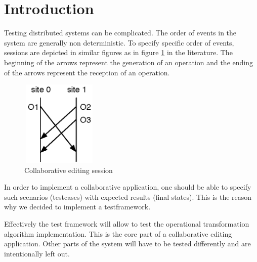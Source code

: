 \documentclass[11pt,a4paper]{article}
\begin{document}
\setlength{\parindent}{0pt}


\newpage

\tableofcontents
\newpage

\listoftables
\listoffigures
\newpage



\section{Introduction}
Testing distributed systems can be complicated. The order of events in the system are generally non deterministic. To specify specific order of events, sessions are depicted in similar figures as in figure \ref{fig:session} in the literature. The beginning of the arrows represent the generation of an operation and the ending of the arrows represent the reception of an operation.

\begin{figure}[H]
 \centering
 \includegraphics[width=3.7cm,height=4.1cm]{../../images/testframework_puzzle.eps}
 \caption{Collaborative editing session}
 \label{fig:session}
\end{figure}

In order to implement a collaborative application, one should be able to specify such scenarios (testcases) with expected results (final states). This is the reason why we decided to implement a testframework.

Effectively the test framework will allow to test the operational transformation algorithm implementation. This is the core part of a collaborative editing application. Other parts of the system will have to be tested differently and are intentionally left out.
\end{document}
